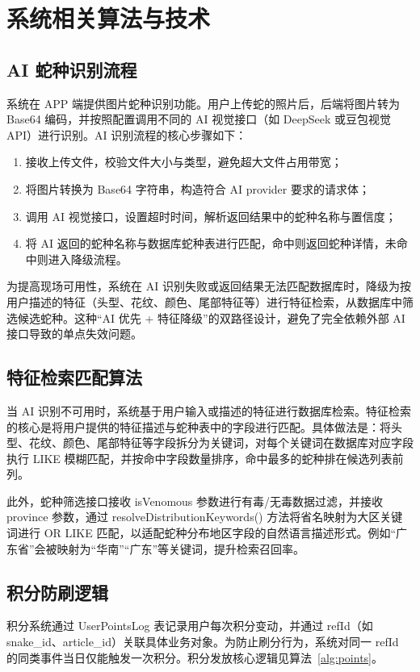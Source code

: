 \documentclass[12pt, a4paper, oneside]{ctexrep}
\begin{document}
\chapter{系统相关算法与技术}

\section{AI 蛇种识别流程}
系统在 APP 端提供图片蛇种识别功能。用户上传蛇的照片后，后端将图片转为 Base64 编码，并按照配置调用不同的 AI 视觉接口（如 DeepSeek 或豆包视觉 API）进行识别。AI 识别流程的核心步骤如下：

\begin{enumerate}
  \item 接收上传文件，校验文件大小与类型，避免超大文件占用带宽；
  \item 将图片转换为 Base64 字符串，构造符合 AI provider 要求的请求体；
  \item 调用 AI 视觉接口，设置超时时间，解析返回结果中的蛇种名称与置信度；
  \item 将 AI 返回的蛇种名称与数据库蛇种表进行匹配，命中则返回蛇种详情，未命中则进入降级流程。
\end{enumerate}

为提高现场可用性，系统在 AI 识别失败或返回结果无法匹配数据库时，降级为按用户描述的特征（头型、花纹、颜色、尾部特征等）进行特征检索，从数据库中筛选候选蛇种。这种“AI 优先 + 特征降级”的双路径设计，避免了完全依赖外部 AI 接口导致的单点失效问题。

\section{特征检索匹配算法}
当 AI 识别不可用时，系统基于用户输入或描述的特征进行数据库检索。特征检索的核心是将用户提供的特征描述与蛇种表中的字段进行匹配。具体做法是：将头型、花纹、颜色、尾部特征等字段拆分为关键词，对每个关键词在数据库对应字段执行 LIKE 模糊匹配，并按命中字段数量排序，命中最多的蛇种排在候选列表前列。

此外，蛇种筛选接口接收 isVenomous 参数进行有毒/无毒数据过滤，并接收 province 参数，通过 resolveDistributionKeywords() 方法将省名映射为大区关键词进行 OR LIKE 匹配，以适配蛇种分布地区字段的自然语言描述形式。例如“广东省”会被映射为“华南”“广东”等关键词，提升检索召回率。

\section{积分防刷逻辑}
积分系统通过 UserPointsLog 表记录用户每次积分变动，并通过 refId（如 snake\_id、article\_id）关联具体业务对象。为防止刷分行为，系统对同一 refId 的同类事件当日仅能触发一次积分。积分发放核心逻辑见算法~\ref{alg:points}。
\end{document}
